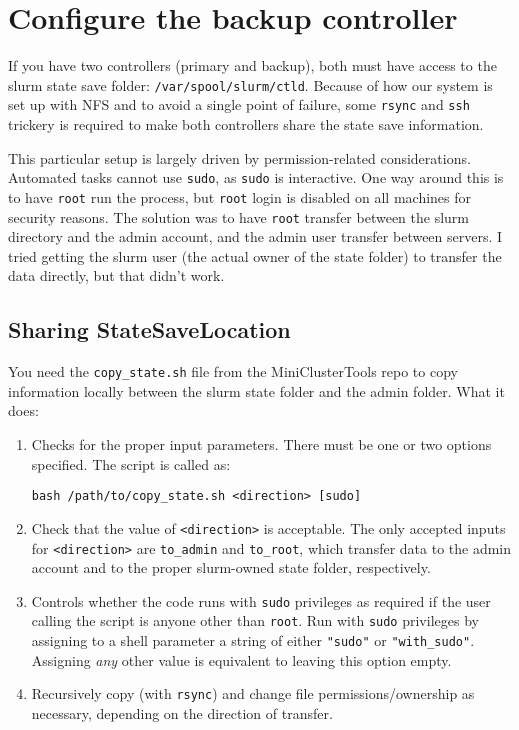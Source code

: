 
\section{Configure the backup controller} \label{sec:backupControllerSetup}

If you have two controllers (primary and backup), both must have access to the slurm state save folder: \texttt{/var/spool/slurm/ctld}. Because of how our system is set up with NFS and to avoid a single point of failure, some \texttt{rsync} and \texttt{ssh} trickery is required to make both controllers share the state save information.

This particular setup is largely driven by permission-related considerations. Automated tasks cannot use \texttt{sudo}, as \texttt{sudo} is interactive. One way around this is to have \texttt{root} run the process, but \texttt{root} login is disabled on all machines for security reasons. The solution was to have \texttt{root} transfer between the slurm directory and the admin account, and the admin user transfer between servers. I tried getting the slurm user (the actual owner of the state folder) to transfer the data directly, but that didn't work.

\subsection{Sharing StateSaveLocation} \label{subsec:shareStateSave}

You need the \texttt{copy\_state.sh} file from the MiniClusterTools repo to copy information locally between the slurm state folder and the admin folder. What it does:

\begin{enumerate}
  \item Checks for the proper input parameters. There must be one or two options specified. The script is called as:

    \texttt{bash /path/to/copy\_state.sh <direction> [sudo]}

  \item Check that the value of \texttt{<direction>} is acceptable. The only accepted inputs for \texttt{<direction>} are \texttt{to\_admin} and \texttt{to\_root}, which transfer data to the admin account and to the proper slurm-owned state folder, respectively. 

  \item Controls whether the code runs with \texttt{sudo} privileges as required if the user calling the script is anyone other than \texttt{root}. Run with \texttt{sudo} privileges by assigning to a shell parameter a string of either \texttt{"sudo"} or \texttt{"with\_sudo"}. Assigning \emph{any} other value is equivalent to leaving this option empty.

  \item Recursively copy (with \texttt{rsync}) and change file permissions/ownership as necessary, depending on the direction of transfer.
\end{enumerate}

